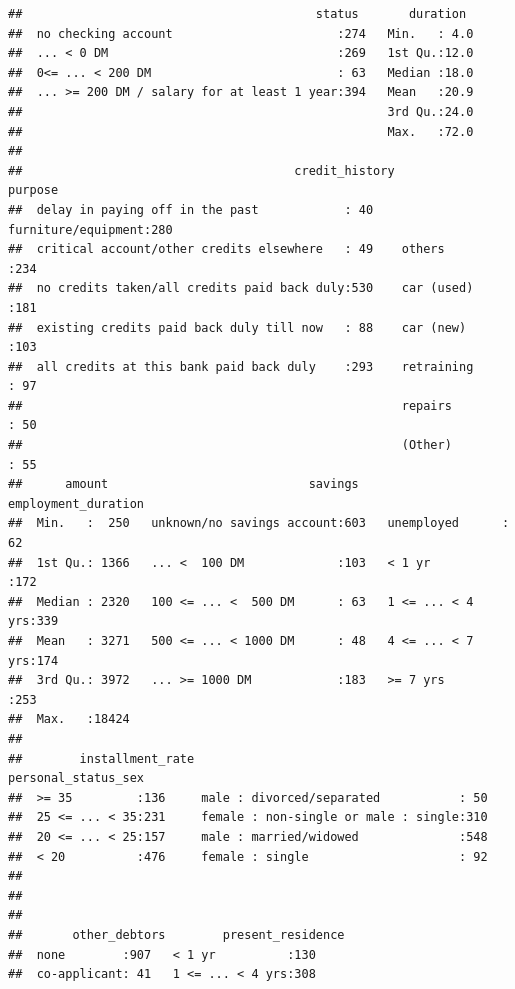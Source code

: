 \documentclass[
]{article}
\begin{document}
\begin{verbatim}
##                                         status       duration   
##  no checking account                       :274   Min.   : 4.0  
##  ... < 0 DM                                :269   1st Qu.:12.0  
##  0<= ... < 200 DM                          : 63   Median :18.0  
##  ... >= 200 DM / salary for at least 1 year:394   Mean   :20.9  
##                                                   3rd Qu.:24.0  
##                                                   Max.   :72.0  
##                                                                 
##                                      credit_history                purpose   
##  delay in paying off in the past            : 40    furniture/equipment:280  
##  critical account/other credits elsewhere   : 49    others             :234  
##  no credits taken/all credits paid back duly:530    car (used)         :181  
##  existing credits paid back duly till now   : 88    car (new)          :103  
##  all credits at this bank paid back duly    :293    retraining         : 97  
##                                                     repairs            : 50  
##                                                     (Other)            : 55  
##      amount                            savings          employment_duration
##  Min.   :  250   unknown/no savings account:603   unemployed      : 62     
##  1st Qu.: 1366   ... <  100 DM             :103   < 1 yr          :172     
##  Median : 2320   100 <= ... <  500 DM      : 63   1 <= ... < 4 yrs:339     
##  Mean   : 3271   500 <= ... < 1000 DM      : 48   4 <= ... < 7 yrs:174     
##  3rd Qu.: 3972   ... >= 1000 DM            :183   >= 7 yrs        :253     
##  Max.   :18424                                                             
##                                                                            
##        installment_rate                           personal_status_sex
##  >= 35         :136     male : divorced/separated           : 50     
##  25 <= ... < 35:231     female : non-single or male : single:310     
##  20 <= ... < 25:157     male : married/widowed              :548     
##  < 20          :476     female : single                     : 92     
##                                                                      
##                                                                      
##                                                                      
##       other_debtors        present_residence
##  none        :907   < 1 yr          :130    
##  co-applicant: 41   1 <= ... < 4 yrs:308    

\end{verbatim}
\end{document}
